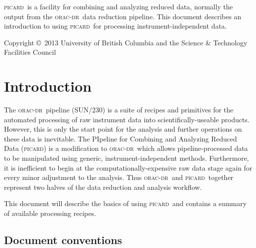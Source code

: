 \documentclass[twoside,11pt]{article}
\newcommand{\stardocinitials}  {SUN}
\newcommand{\stardoccopyright}
{Copyright \copyright\ 2013 University of British Columbia and the Science \& Technology Facilities Council}
\newcommand{\stardocnumber}    {265.0}
\newcommand{\stardocabstract}  {

  \picard\ is a facility for combining and analyzing reduced data,
  normally the output from the \oracdr\ data reduction pipeline. This
  document describes an introduction to using \picard\ for processing
  instrument-independent data.

}
\newcommand{\stardocname}{\stardocinitials /\stardocnumber}
\newenvironment{latexonly}{}{}
\newcommand{\xref}[3]{#1}
\newcommand{\xlabel}[1]{}
\renewcommand{\_}{\texttt{\symbol{95}}}
\newcommand{\oracdr}{\textsc{orac-dr}}
\newcommand{\oracsun}{\xref{SUN/230}{sun230}{}}
\newcommand{\picard}{\textsc{picard}}
\renewcommand{\thepage}{\roman{page}}
\begin{document}
\stardocabstract

\begin{latexonly}
\newpage
\vspace*{\fill}
\stardoccopyright
\end{latexonly}

  \newpage
  \begin{latexonly}
    \setlength{\parskip}{0mm}
    \tableofcontents
    \setlength{\parskip}{\medskipamount}
    \markboth{\stardocname}{\stardocname}
  \end{latexonly}

\cleardoublepage
\renewcommand{\thepage}{\arabic{page}}
\setcounter{page}{1}


\section{\xlabel{introduction}Introduction\label{se:intro}}

The \oracdr\ pipeline (\oracsun) is a suite of recipes and primitives
for the automated processing of raw instrument data into
scientifically-useable products. However, this is only the start point
for the analysis and further operations on these data is
inevitable. The PIpeline for Combining and Analyzing Reduced Data
(\picard) is a modification to \oracdr\ which allows
pipeline-processed data to be manipulated using generic,
instrument-independent methods. Furthermore, it is inefficient to
begin at the computationally-expensive raw data stage again for every
minor adjustment to the analysis. Thus \oracdr\ and \picard\ together
represent two halves of the data reduction and analysis workflow.

This document will describe the basics of using \picard\ and contains
a summary of available processing recipes.

\subsection{Document conventions}
\end{document}
